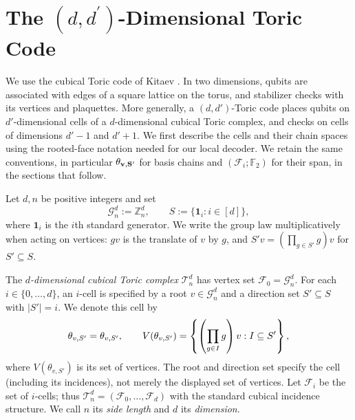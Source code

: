 \section{The $(d,d^{\prime})$-Dimensional Toric Code}

We use the cubical Toric code of Kitaev \cite{Kitaev1997QuantumCA,Dennis_2002}. In two dimensions, qubits are associated with edges of a square lattice on the torus, and stabilizer checks with its vertices and plaquettes. More generally, a $(d,d')$-Toric code places qubits on $d'$-dimensional cells of a $d$-dimensional cubical Toric complex, and checks on cells of dimensions $d'-1$ and $d'+1$. We first describe the cells and their chain spaces using the rooted-face notation needed for our local decoder. We retain the same conventions, in particular $\mathbf{\theta_{v ,S'} }$ for basis chains and $(\mathcal F_i;\mathbb F_2)$ for their span, in the sections that follow.

\begin{definition}
\label{def:toric_complex}
Let $d,n$ be positive integers and set
\begin{equation*}
  \mathcal G_n^d:=\mathbb Z_n^d,
  \qquad S:=\{\mathbf 1_i:i\in[d]\},
\end{equation*}
where $\mathbf 1_i$ is the $i$th standard generator. We write the group law multiplicatively when acting on vertices: $gv$ is the translate of $v$ by $g$, and $S'v=(\prod_{g\in S'}g)v$ for $S'\subseteq S$.

The \emph{$d$-dimensional cubical Toric complex} $\mathcal T_n^d$ has vertex set $\mathcal F_0=\mathcal G_n^d$. For each $i\in\{0,\ldots,d\}$, an $i$-cell is specified by a root $v\in\mathcal G_n^d$ and a direction set $S'\subseteq S$ with $|S'|=i$. We denote this cell by
\begin{equation*}
  \theta_{v ,S'}=\theta_{v,S'},
  \qquad V(\theta_{v,S'})=
  \left\{\left(\prod_{g\in I}g\right)v:I\subseteq S'\right\},
\end{equation*}
where $V(\theta_{v,S'})$ is its set of vertices. The root and direction set specify the cell (including its incidences), not merely the displayed set of vertices. Let $\mathcal F_i$ be the set of $i$-cells; thus $\mathcal T_n^d=(\mathcal F_0,\ldots,\mathcal F_d)$ with the standard cubical incidence structure. We call $n$ its \emph{side length} and $d$ its \emph{dimension}.
\end{definition}




